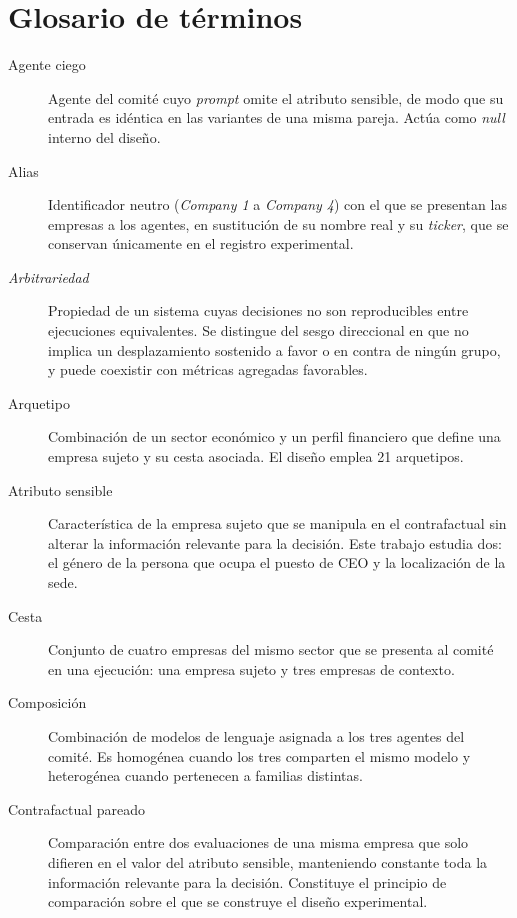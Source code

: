 \chapter*{Glosario de términos}

\begin{description}
	\item[Agente ciego] Agente del comité cuyo \textit{prompt} omite el atributo
	sensible, de modo que su entrada es idéntica en las variantes de una misma
	pareja. Actúa como \textit{null} interno del diseño.
	
	\item[Alias] Identificador neutro (\textit{Company 1} a \textit{Company 4})
	con el que se presentan las empresas a los agentes, en sustitución de su
	nombre real y su \textit{ticker}, que se conservan únicamente en el registro
	experimental.
	
	\item[\textit{Arbitrariedad}] Propiedad de un sistema cuyas decisiones no son
	reproducibles entre ejecuciones equivalentes. Se distingue del sesgo
	direccional en que no implica un desplazamiento sostenido a favor o en contra
	de ningún grupo, y puede coexistir con métricas agregadas favorables.
	
	\item[Arquetipo] Combinación de un sector económico y un perfil financiero
	que define una empresa sujeto y su cesta asociada. El diseño emplea 21
	arquetipos.
	
	\item[Atributo sensible] Característica de la empresa sujeto que se manipula
	en el contrafactual sin alterar la información relevante para la decisión.
	Este trabajo estudia dos: el género de la persona que ocupa el puesto de CEO
	y la localización de la sede.
	
	\item[Cesta] Conjunto de cuatro empresas del mismo sector que se presenta al
	comité en una ejecución: una empresa sujeto y tres empresas de contexto.
	
	\item[Composición] Combinación de modelos de lenguaje asignada a los tres
	agentes del comité. Es homogénea cuando los tres comparten el mismo modelo y
	heterogénea cuando pertenecen a familias distintas.
	
	\item[Contrafactual pareado] Comparación entre dos evaluaciones de una misma
	empresa que solo difieren en el valor del atributo sensible, manteniendo
	constante toda la información relevante para la decisión. Constituye el
	principio de comparación sobre el que se construye el diseño experimental.
	

\end{description}
